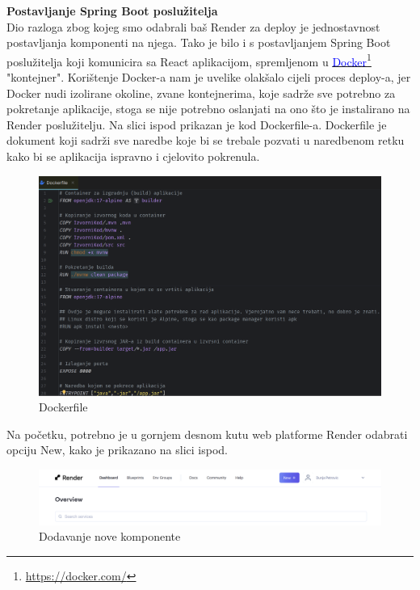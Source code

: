 		\textbf{Postavljanje Spring Boot poslužitelja} \\
		Dio razloga zbog kojeg smo odabrali baš Render za deploy je jednostavnost postavljanja komponenti na njega. Tako je bilo i s postavljanjem Spring Boot poslužitelja koji komunicira sa React aplikacijom, spremljenom u \textcolor{blue}{\underline{\href{https://docker.com/}{\textcolor{blue}{Docker}}}}\footnote{\url{https://docker.com/}} "kontejner". Korištenje Docker-a nam je uvelike olakšalo cijeli proces deploy-a, jer Docker nudi izolirane okoline, zvane kontejnerima, koje sadrže sve potrebno za pokretanje aplikacije, stoga se nije potrebno oslanjati na ono što je instalirano na Render poslužitelju. Na slici ispod prikazan je kod Dockerfile-a. Dockerfile je dokument koji sadrži sve naredbe koje bi se trebale pozvati u naredbenom retku kako bi se aplikacija ispravno i cjelovito pokrenula.
		
		\begin{figure}[H]
			\includegraphics[scale=0.4]{slike/Dockerfile.PNG} %
			\centering
			\caption{Dockerfile}
			\label{Dockerfile}
		\end{figure}
		
		
Na početku, potrebno je u gornjem desnom kutu web platforme Render odabrati opciju New, kako je prikazano na slici ispod.
		
			\begin{figure}[H]
			\includegraphics[scale=0.4]{slike/Render_NEW.PNG} %
			\centering
			\caption{Dodavanje nove komponente}
			\label{Dodavanje nove komponente}
		\end{figure}
		
